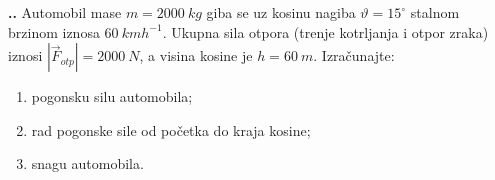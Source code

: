 
\noindent 
\textbf{
\thecjelina.\thezadatak.}
Automobil mase $m=2000\ kg$ giba se uz kosinu nagiba $\vartheta=15^\circ $ stalnom brzinom iznosa $60\ kmh^{-1}$.
Ukupna sila otpora (trenje kotrljanja i otpor zraka) iznosi $| \vec{F}_{otp}|=2000\ N $, a visina kosine je 
$h=60\ m$. Izračunajte: 
\begin{enumerate}[label=\alph*)]
 \item pogonsku silu automobila;
 \item rad pogonske sile od početka do kraja kosine;
 \item snagu automobila.
\end{enumerate}
